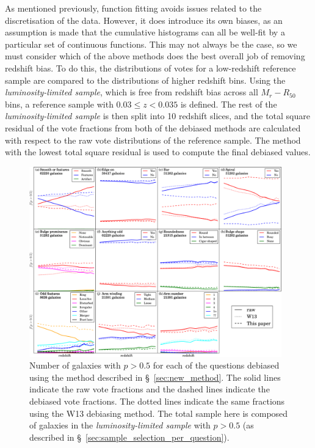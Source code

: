 \documentclass[useAMS,usenatbib]{mn2e}
\begin{document}
As mentioned previously, function fitting avoids issues related to the discretisation of the data. However, it does introduce its own biases, as an assumption is made that the cumulative histograms can all be well-fit by a particular set of continuous functions. This may not always be the case, so we must consider which of the above methods does the best overall job of removing redshift bias. To do this, the distributions of votes for a low-redshift reference sample are compared to the distributions of higher redshift bins. Using the \textit{luminosity-limited sample}, which is free from redshift bias across all $M_r - R_{50}$ bins, a reference sample with $0.03 \leq z < 0.035$ is defined. The rest of the \textit{luminosity-limited sample} is then split into 10 redshift slices, and the total square residual of the vote fractions from both of the debiased methods are calculated with respect to the raw vote distributions of the reference sample. The method with the lowest total square residual is used to compute the final debiased values.

\begin{figure}
		\centering

        \includegraphics[width=0.975\textwidth]{Images/Bias/Debiasing/all_thresholds.pdf}

        \caption{Number of galaxies with $p>0.5$ for each of the questions debiased using the method described in \S~\ref{sec:new_method}. The solid lines indicate the raw vote fractions and the dashed lines indicate the debiased vote fractions. The dotted lines indicate the same fractions using the W13 debiasing method. The total sample here is composed of galaxies in the \textit{luminosity-limited sample} with $p>0.5$ (as described in \S~\ref{sec:sample_selection_per_question}).}

        \label{fig:all_thresholds}

\end{figure}
\end{document}
